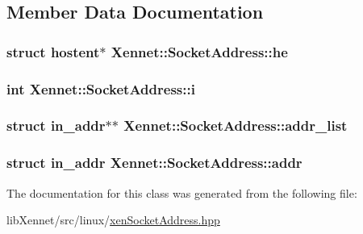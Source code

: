 \subsection{Member Data Documentation}
\hypertarget{classXennet_1_1SocketAddress_065a63b0ddd2743979f60bed0228d4bc}{
\subsubsection{\setlength{\rightskip}{0pt plus 5cm}struct hostent$\ast$ {\bf Xennet::SocketAddress::he}}}
\label{classXennet_1_1SocketAddress_065a63b0ddd2743979f60bed0228d4bc}


\hypertarget{classXennet_1_1SocketAddress_f278e5c242778c1ffaac88fd303b8968}{
\subsubsection{\setlength{\rightskip}{0pt plus 5cm}int {\bf Xennet::SocketAddress::i}}}
\label{classXennet_1_1SocketAddress_f278e5c242778c1ffaac88fd303b8968}


\hypertarget{classXennet_1_1SocketAddress_b72fd48ae36c1a0a8b77d6947e559ad5}{
\subsubsection{\setlength{\rightskip}{0pt plus 5cm}struct in\_\-addr$\ast$$\ast$ {\bf Xennet::SocketAddress::addr\_\-list}}}
\label{classXennet_1_1SocketAddress_b72fd48ae36c1a0a8b77d6947e559ad5}


\hypertarget{classXennet_1_1SocketAddress_d52092d77a63d9c7a754741ebb1e79ac}{
\subsubsection{\setlength{\rightskip}{0pt plus 5cm}struct in\_\-addr {\bf Xennet::SocketAddress::addr}}}
\label{classXennet_1_1SocketAddress_d52092d77a63d9c7a754741ebb1e79ac}




The documentation for this class was generated from the following file:\begin{CompactItemize}
\item 
libXennet/src/linux/\hyperlink{xenSocketAddress_8hpp}{xenSocketAddress.hpp}\end{CompactItemize}
